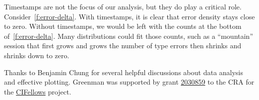 \documentclass[english,submission,cleveref]{programming}
\begin{document}
Timestamps are not the focus of our analysis, but they do play a critical role.
Consider~\cref{f:error-delta}.
With timestamps, it is clear that error density stays close to zero.
Without timestamps, we would be left with the counts at the bottom
of~\cref{f:error-delta}.
Many distributions could fit those counts, such as a ``mountain'' session that first
grows and grows the number of type errors then shrinks and shrinks down to zero.


\acks

Thanks to Benjamin Chung for several helpful discussions about data analysis
and effective plotting.
Greenman was supported by
grant \href{https://nsf.gov/awardsearch/showAward?AWD_ID=2030859&HistoricalAwards=false}{2030859}
to the CRA for the \href{https://cifellows2020.org}{CIFellows} project.

%
%
%
%
%
%


\end{document}
